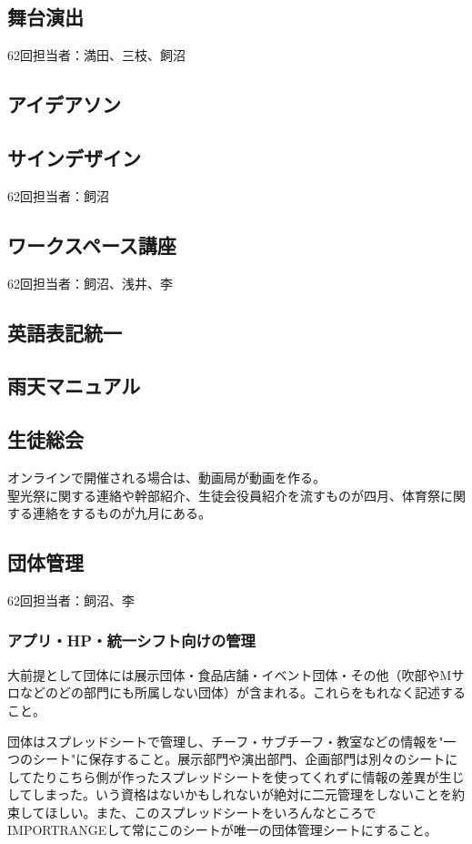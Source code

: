 \documentclass[dvipdfmx,jb5]{jarticle}
\begin{document}
 \subsection{舞台演出}
62回担当者：満田、三枝、飼沼

 \subsection{アイデアソン}

 \subsection{サインデザイン}
62回担当者：飼沼

 \subsection{ワークスペース講座}
62回担当者：飼沼、浅井、李

 \subsection{英語表記統一}

 \subsection{雨天マニュアル}

 \subsection{生徒総会}
 オンラインで開催される場合は、動画局が動画を作る。\\
 聖光祭に関する連絡や幹部紹介、生徒会役員紹介を流すものが四月、体育祭に関する連絡をするものが九月にある。\\


 \subsection{団体管理}
 62回担当者：飼沼、李
  \subsubsection{アプリ・HP・統一シフト向けの管理}
 大前提として団体には展示団体・食品店舗・イベント団体・その他（吹部やMサロなどのどの部門にも所属しない団体）が含まれる。これらをもれなく記述すること。

 団体はスプレッドシートで管理し、チーフ・サブチーフ・教室などの情報を"一つのシート"に保存すること。展示部門や演出部門、企画部門は別々のシートにしてたりこちら側が作ったスプレッドシートを使ってくれずに情報の差異が生じしてしまった。いう資格はないかもしれないが絶対に二元管理をしないことを約束してほしい。また、このスプレッドシートをいろんなところでIMPORTRANGEして常にこのシートが唯一の団体管理シートにすること。
\end{document}

